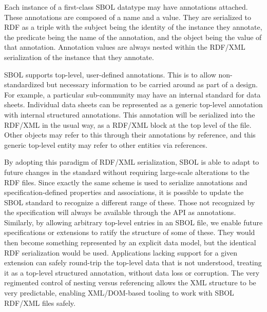 Each instance of a first-class SBOL datatype may have annotations attached. These annotations are composed of a name and a value.  They are serialized to RDF as a triple with the subject being the identity of the instance they annotate, the predicate being the name of the annotation, and the object being the value of that annotation. Annotation values are always nested within the RDF/XML serialization of the instance that they annotate.

SBOL supports top-level, user-defined annotations. This is to allow non-standardized but necessary information to be carried around as part of a design. For example, a particular sub-community may have an internal standard for data sheets. Individual data sheets can be represented as a generic top-level annotation with internal structured annotations. This annotation will be serialized into the RDF/XML in the usual way, as a RDF/XML block at the top level of the file. Other objects may refer to this through their annotations by reference, and this generic top-level entity may refer to other entities via references.


By adopting this paradigm of RDF/XML serialization, SBOL is able to adapt to future changes in the standard without requiring large-scale alterations to the RDF files. Since exactly the same scheme is used to serialize annotations and specification-defined properties and associations, it is possible to update the SBOL standard to recognize a different range of these. Those not recognized by the specification will always be available through the API as annotations. Similarly, by allowing arbitrary top-level entries in an SBOL file, we enable future specifications or extensions to ratify the structure of some of these. They would then become something represented by an explicit data model, but the identical RDF serialization would be used. Applications lacking support for a given extension can safely round-trip the top-level data that is not understood, treating it as a top-level structured annotation, without data loss or corruption. The very regimented control of nesting versus referencing allows the XML structure to be very predictable, enabling XML/DOM-based tooling to work with SBOL RDF/XML files safely.
